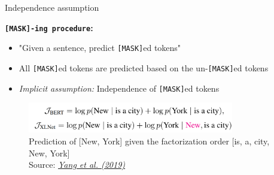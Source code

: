 
\begin{frame}{Independence assumption}

\vspace{1.5cm}

\textbf{\texttt{[MASK]-ing procedure}:}

\begin{itemize}
	\item "Given a sentence, predict \texttt{[MASK]}ed tokens"
	\item All \texttt{[MASK]}ed tokens are predicted based on the un-\texttt{[MASK]}ed tokens
	\item \textit{Implicit assumption:} Independence of \texttt{[MASK]}ed tokens
\end{itemize}

	\begin{figure}
		\centering
		\includegraphics[width = 9cm]{figure/xlnet-objective}\\ 
		{\tiny Prediction of [New, York] given the factorization order [is, a, city, New, York]\\\footnotesize Source: \href{https://papers.nips.cc/paper/8812-xlnet-generalized-autoregressive-pretraining-for-language-understanding.pdf} \it Yang et al. (2019)}
	\end{figure}
	
\end{frame}


